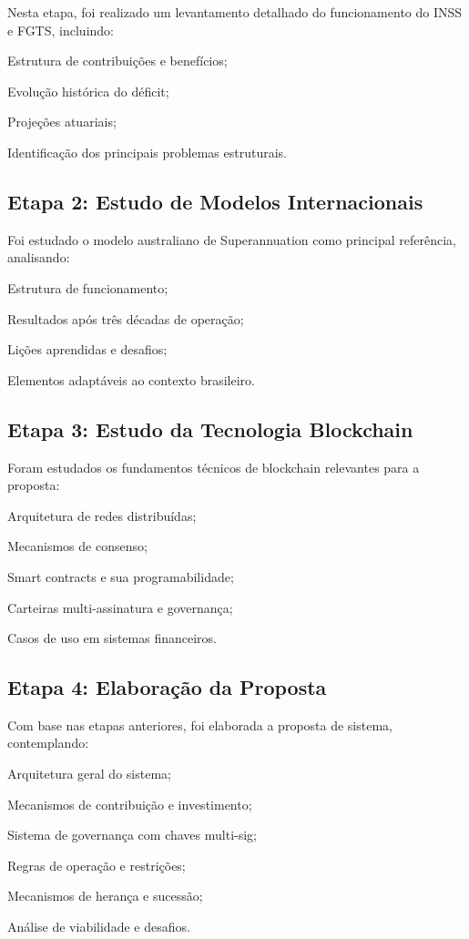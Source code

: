 Nesta etapa, foi realizado um levantamento detalhado do funcionamento do INSS e FGTS, incluindo:
\begin{alineas}
    \item Estrutura de contribuições e benefícios;
    \item Evolução histórica do déficit;
    \item Projeções atuariais;
    \item Identificação dos principais problemas estruturais.
\end{alineas}

\subsection{Etapa 2: Estudo de Modelos Internacionais}

Foi estudado o modelo australiano de Superannuation como principal referência, analisando:
\begin{alineas}
    \item Estrutura de funcionamento;
    \item Resultados após três décadas de operação;
    \item Lições aprendidas e desafios;
    \item Elementos adaptáveis ao contexto brasileiro.
\end{alineas}

\subsection{Etapa 3: Estudo da Tecnologia Blockchain}

Foram estudados os fundamentos técnicos de blockchain relevantes para a proposta:
\begin{alineas}
    \item Arquitetura de redes distribuídas;
    \item Mecanismos de consenso;
    \item Smart contracts e sua programabilidade;
    \item Carteiras multi-assinatura e governança;
    \item Casos de uso em sistemas financeiros.
\end{alineas}

\subsection{Etapa 4: Elaboração da Proposta}

Com base nas etapas anteriores, foi elaborada a proposta de sistema, contemplando:
\begin{alineas}
    \item Arquitetura geral do sistema;
    \item Mecanismos de contribuição e investimento;
    \item Sistema de governança com chaves multi-sig;
    \item Regras de operação e restrições;
    \item Mecanismos de herança e sucessão;
    \item Análise de viabilidade e desafios.
\end{alineas}

